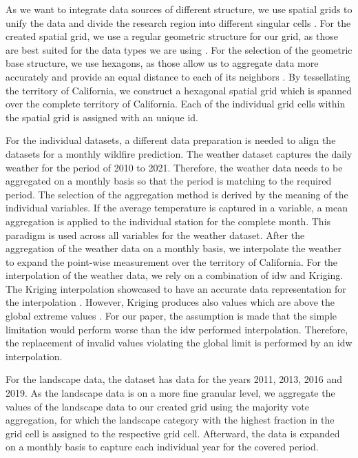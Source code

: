 \documentclass[
]{ceurart}
\begin{document}
As we want to integrate data sources of different structure, we use spatial grids to unify the data and divide the research region into different singular cells \cite{Rigaux.2001}. For the created spatial grid, we use a regular geometric structure for our grid, as those are best suited for the data types we are using \cite{Rigaux.2001}. For the selection of the geometric base structure, we use hexagons, as those allow us to aggregate data more accurately \cite{Wang.2018} and provide an equal distance to each of its neighbors \cite{Birch.2007}. By tessellating the territory of California, we construct a hexagonal spatial grid which is spanned over the complete territory of California. Each of the individual grid cells within the spatial grid is assigned with an unique \gls*{id}.

For the individual datasets, a different data preparation is needed to align the datasets for a monthly wildfire prediction. The weather dataset captures the daily weather for the period of 2010 to 2021. Therefore, the weather data needs to be aggregated on a monthly basis so that the period is matching to the required period. The selection of the aggregation method is derived by the meaning of the individual variables. If the average temperature is captured in a variable, a mean aggregation is applied to the individual station for the complete month. This paradigm is used across all variables for the weather dataset. After the aggregation of the weather data on a monthly basis, we interpolate the weather to expand the point-wise measurement over the territory of California. For the interpolation of the weather data, we rely on a combination of \gls*{idw} and Kriging. The Kriging interpolation showcased to have an accurate data representation for the interpolation \cite{Pede.2018}. However, Kriging produces also values which are above the global extreme values \cite{Matheron.1963}. For our paper, the assumption is made that the simple limitation would perform worse than the \gls{idw} performed interpolation. Therefore, the replacement of invalid values violating the global limit is performed by an \gls{idw} interpolation.

For the landscape data, the dataset has data for the years 2011, 2013, 2016 and 2019. As the landscape data is on a more fine granular level, we aggregate the values of the landscape data to our created grid using the majority vote aggregation, for which the landscape category with the highest fraction in the grid cell is assigned to the respective grid cell. Afterward, the data is expanded on a monthly basis to capture each individual year for the covered period.
\end{document}
